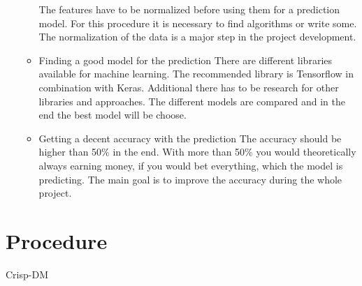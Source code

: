 \begin{itemize}
\begin{itemize}
			The features have to be normalized before using them for a prediction model. For this procedure it is necessary to find algorithms or write some. The normalization of the data is a major step in the project development.
			\item Finding a good model for the prediction 
			There are different libraries available for machine learning. The recommended library is Tensorflow in combination with Keras. Additional there has to be research for other libraries and approaches. The different models are compared and in the end the best model will be choose. 
			\item Getting a decent accuracy with the prediction \newline
			The accuracy should be higher than 50\% in the end. With more than 50\% you would theoretically always earning money, if you would bet everything, which the model is predicting. The main goal is to improve the accuracy during the whole project. 
		\end{itemize}
\end{itemize}
\section{Procedure}

Crisp-DM